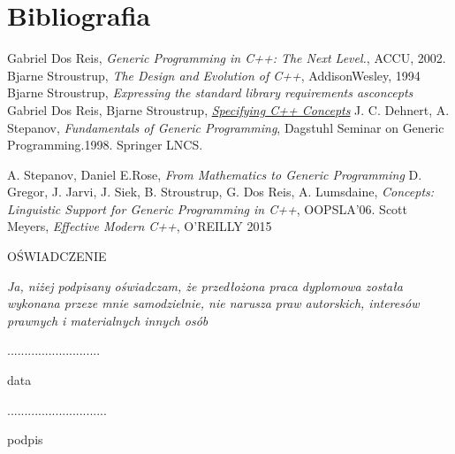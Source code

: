 \documentclass[11pt, a4paper]{article}
\begin{document}
	\section{Bibliografia}
	\begin{thebibliography}{6}
	
	 Gabriel Dos Reis, \emph{Generic Programming in C++: The Next Level.}, ACCU, 2002.
	 Bjarne Stroustrup, \emph{The Design and Evolution of C++}, AddisonWesley, 1994
	  Bjarne Stroustrup, \emph{Expressing the standard library requirements asconcepts}	
	 Gabriel Dos Reis, Bjarne Stroustrup, \href{http://www.stroustrup.com/popl06.pdf}{\emph{Specifying C++ Concepts}}
	 J. C. Dehnert, A. Stepanov, \emph{Fundamentals of Generic Programming}, Dagstuhl Seminar on Generic Programming.1998. Springer LNCS.

	 A. Stepanov, Daniel E.Rose, \emph{From Mathematics to Generic Programming}
	 D. Gregor, J. Jarvi, J. Siek, B. Stroustrup, G. Dos Reis, A. Lumsdaine, \emph{Concepts: Linguistic Support for Generic Programming in C++}, OOPSLA’06.
	 Scott Meyers, \emph{Effective Modern C++}, O'REILLY 2015
	\end{thebibliography}
	\newpage
	\begin{center}
	OŚWIADCZENIE	
	\end{center}
	
	\emph{Ja, niżej podpisany oświadczam, że przedłożona praca dyplomowa została wykonana przeze mnie samodzielnie, nie narusza praw autorskich, interesów prawnych i materialnych innych osób}\newline\newline
	
	\begin{minipage}[t]{7cm}
	\flushleft
	\noindent \textsc{...........................}

	data
	\end{minipage}
	\hfill
	\begin{minipage}[t]{7cm}
	\flushright
	\textsc{.............................}

	podpis
	\end{minipage}
\end{document}
